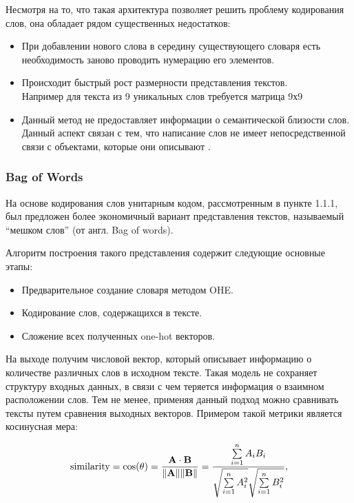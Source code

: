 Несмотря на то, что такая архитектура позволяет решить проблему кодирования слов, она обладает рядом существенных недостатков:
\begin{itemize}
  \item При добавлении нового слова в середину существующего словаря есть необходимость заново проводить нумерацию его элементов.
  \item Происходит быстрый рост размерности представления текстов. \\ Например для текста из 9 уникальных слов требуется матрица 9х9
 \item Данный метод не предоставляет информации о семантической близости слов. Данный аспект связан с тем, что написание слов не имеет непосредственной связи с объектами, которые они описывают \autocite{saussure1916course}.
\end{itemize}

\subsubsection{Bag of Words}
На основе кодирования слов унитарным кодом, рассмотренным в пункте 1.1.1, был предложен более экономичный вариант представления текстов, называемый “мешком слов” (от англ. Bag of words).

Алгоритм построения такого представления содержит следующие основные этапы:
\begin{itemize}
  \item Предварительное создание словаря методом OHE.
  \item Кодирование слов, содержащихся в тексте.
 \item Сложение всех полученных one-hot векторов.
\end{itemize}

На выходе получим числовой вектор, который описывает информацию о количестве различных слов в исходном тексте.
Такая модель не сохраняет структуру входных данных, в связи с чем теряется информация о взаимном расположении слов.
Тем не менее, применяя данный подход можно сравнивать тексты путем сравнения выходных векторов. Примером такой метрики является косинусная мера:

\begin{equation}\label{eq:cos}
{\displaystyle {\text{similarity}}=\cos(\theta )={\mathbf {A} \cdot \mathbf {B}  \over \|\mathbf {A} \|\|\mathbf {B} \|}={\frac {\sum \limits _{i=1}^{n}{A_{i}B_{i}}}{{\sqrt {\sum \limits _{i=1}^{n}{A_{i}^{2}}}}{\sqrt {\sum \limits _{i=1}^{n}{B_{i}^{2}}}}}},}
\end{equation}

